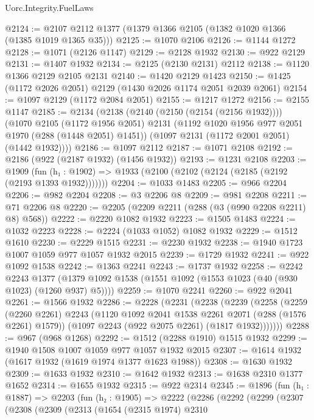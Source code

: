 \begin{lexlean}{Uorc.Integrity.FuelLaws}
\begin{coremodule}
@2124 := @2107 @2112 @1377 (@1379 @1366 @2105 (@1382 @1020 @1366 (@1385 @1019 @1365 @35)))
@2125 := @1070 @2106
@2126 := @1144 @1272
@2128 := @1071 (@2126 @1147)
@2129 := @2128 @1932
@2130 := @922 @2129
@2131 := @1407 @1932
@2134 := @2125 (@2130 @2131) @2112
@2138 := @1120 @1366 @2129 @2105 @2131
@2140 := @1420 @2129 @1423
@2150 := @1425 (@1172 @2026 @2051) @2129 (@1430 @2026 @1174 @2051 @2039 @2061)
@2154 := @1097 @2129 (@1172 @2084 @2051)
@2155 := @1217 @1272
@2156 := @2155 @1147
@2185 := @2134
    (@2138
      (@2140 (@2150 (@2154 (@2156 @1932))))
      (@1070
        @2105
        (@1172 @1956 @2051)
        @2131
        (@1192 @1020 @1956 @977 @2051 @1970 (@288 (@1448 @2051) @1451))
        (@1097 @2131 (@1172 @2001 @2051) (@1442 @1932))))
@2186 := @1097 @2112
@2187 := @1071 @2108
@2192 := @2186 (@922 (@2187 @1932) (@1456 @1932))
@2193 := @1231 @2108
@2203 := @1909
    (fun (h₁ : @1902) => @1933 (@2100 (@2102 (@2124 (@2185 (@2192 (@2193 @1393 @1932)))))))
@2204 := @1033 @1483
@2205 := @966 @2204
@2206 := @982 @2204
@2208 := @3 @2206 @8
@2209 := @981 @2208
@2211 := @71 @2206 @8
@2220 := @2205 (@2209 @2211 (@288 (@3 (@990 @2208 @2211) @8) @568))
@2222 := @2220 @1082 @1932
@2223 := @1505 @1483
@2224 := @1032 @2223
@2228 := @2224 (@1033 @1052) @1082 @1932
@2229 := @1512 @1610
@2230 := @2229 @1515
@2231 := @2230 @1932
@2238 := @1940 @1723 @1007 @1059 @977 @1057 @1932 @2015
@2239 := @1729 @1932
@2241 := @922 @1092 @1538
@2242 := @1363 @2241
@2243 := @1737 @1932
@2258 := @2242
    @2243
    @1377
    (@1379 @1092 @1538 (@1551 @1092 (@1553 @1023 (@40 (@930 @1023) (@1260 @937) @5))))
@2259 := @1070 @2241
@2260 := @922 @2041
@2261 := @1566 @1932
@2286 := @2228
    (@2231
      (@2238
        (@2239
          (@2258
            (@2259
              (@2260 @2261)
              @2243
              (@1120 @1092 @2041 @1538 @2261 @2071 (@288 (@1576 @2261) @1579))
              (@1097 @2243 (@922 @2075 @2261) (@1817 @1932)))))))
@2288 := @967 (@968 @1268)
@2292 := @1512 (@2288 @1910) @1515 @1932
@2299 := @1940 @1508 @1007 @1059 @977 @1057 @1932 @2015
@2307 := @1614 @1932 (@1617 @1932 (@1619 @1974 @1377 @1623 @1988))
@2308 := @1630 @1932
@2309 := @1633 @1932
@2310 := @1642 @1932
@2313 := @1638 @2310 @1377 @1652
@2314 := @1655 @1932
@2315 := @922 @2314
@2345 := @1896
    (fun (h₁ : @1887) =>
    @2203
      (fun (h₂ : @1905) =>
      @2222
        (@2286
          (@2292
            (@2299
              (@2307
                (@2308
                  (@2309
                    (@2313
                      (@1654
                        (@2315 @1974)
                        @2310

\end{coremodule}
\end{lexlean}
